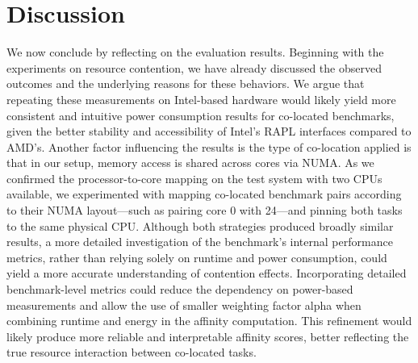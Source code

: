 \section{Discussion}
\label{cha:discussion}
We now conclude by reflecting on the evaluation results.
Beginning with the experiments on resource contention, we have already discussed the observed outcomes and the underlying reasons for these behaviors. We argue that repeating these measurements on Intel-based hardware would likely yield more consistent and intuitive power consumption results for co-located benchmarks, given the better stability and accessibility of Intel's RAPL interfaces compared to AMD's.
Another factor influencing the results is the type of co-location applied is that in our setup, memory access is shared across cores via NUMA. As we confirmed the processor-to-core mapping on the test system with two CPUs available, we experimented with mapping co-located benchmark pairs according to their NUMA layout—such as pairing core 0 with 24—and pinning both tasks to the same physical CPU. Although both strategies produced broadly similar results, a more detailed investigation of the benchmark's internal performance metrics, rather than relying solely on runtime and power consumption, could yield a more accurate understanding of contention effects.
Incorporating detailed benchmark-level metrics could reduce the dependency on power-based measurements and allow the use of smaller weighting factor alpha when combining runtime and energy in the affinity computation. This refinement would likely produce more reliable and interpretable affinity scores, better reflecting the true resource interaction between co-located tasks.

